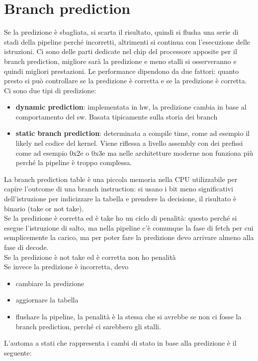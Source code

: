 \documentclass[12pt, oneside]{extbook} %
\begin{document}
\section{Branch prediction}
Se la predizione è sbagliata, si scarta il risultato, quindi si flusha una serie di stadi della pipeline perché incorretti, altrimenti si continua con l'esecuzione delle istruzioni. Ci sono delle parti dedicate nel chip del processore apposite per il branch prediction, migliore sarà la predizione e meno stalli si osserveranno e quindi migliori prestazioni. Le performance dipendono da due fattori: quanto presto si può controllare se la predizione è corretta e se la predizione è corretta.\\ Ci sono due tipi di predizione:
\begin{itemize}
\item \textbf{dynamic prediction}: implementata in hw, la predizione cambia in base al comportamento del sw. Basata tipicamente sulla storia dei branch
\item \textbf{static branch prediction}: determinata a compile time, come ad esempio il \textsf{likely} nel codice del kernel. Viene riflessa a livello assembly con dei prefissi come ad esempio \textsf{0x2e} o \textsf{0x3e} ma nelle architetture moderne non funziona più perché la pipeline è troppo complessa.
\end{itemize}
La branch prediction table è una piccola memoria nella CPU utilizzabile per capire l'outcome di una branch instruction: si usano i bit meno significativi dell'istruzione per indicizzare la tabella e prendere la decisione, il risultato è binario (take or not take). \\ Se la predizione è corretta ed è take ho un ciclo di penalità: questo perché si esegue l'istruzione di salto, ma nella pipeline c'è comunque la fase di fetch per cui semplicemente la carico, ma per poter fare la predizione devo arrivare almeno alla fase di decode.\\ Se la predizione è not take ed è corretta non ho penalità\\ Se invece la predizione è incorretta, devo 
\begin{itemize}
\item cambiare la predizione
\item aggiornare la tabella
\item flushare la pipeline, la penalità è la stessa che si avrebbe se non ci fosse la branch prediction, perché ci sarebbero gli stalli.
\end{itemize}
L'automa a stati che rappresenta i cambi di stato in base alla predizione è il seguente:\\
\end{document}
